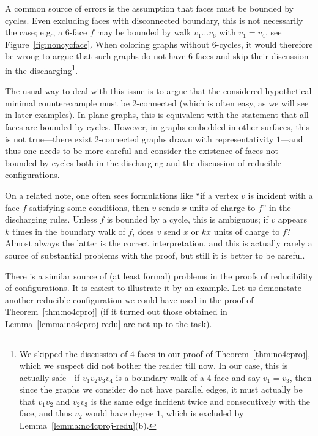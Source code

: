 \documentclass[12pt,twoside,openright,a4paper]{book}
\begin{document}
A common source of errors is the assumption that faces must be bounded by cycles.  Even excluding faces with disconnected boundary,
this is not necessarily the case; e.g., a $6$-face $f$ may be bounded by walk $v_1\ldots v_6$ with $v_1=v_4$, see Figure~\ref{fig:noncycface}.
When coloring graphs without $6$-cycles, it would therefore be wrong to argue that such graphs do not have $6$-faces and skip their
discussion in the discharging\footnote{We skipped the discussion of $4$-faces in our proof of Theorem~\ref{thm:no4cproj}, which
we suspect did not bother the reader till now.  In our case, this is actually safe---if $v_1v_2v_3v_4$ is a boundary walk of a $4$-face
and say $v_1=v_3$, then since the graphs we consider do not have parallel edges, it must actually be that $v_1v_2$ and $v_2v_3$
is the same edge incident twice and consecutively with the face, and thus $v_2$ would have degree $1$, which is excluded by Lemma~\ref{lemma:no4cproj-redu}(b).}.

The usual way to deal with this issue is to argue that the considered hypothetical minimal counterexample must be $2$-connected
(which is often easy, as we will see in later examples).  In plane graphs, this is equivalent with the statement that all faces
are bounded by cycles.  However, in graphs embedded in other surfaces, this is not true---there exist $2$-connected graphs
drawn with representativity $1$---and thus one needs to be more careful and consider the existence of faces not bounded by cycles
both in the discharging and the discussion of reducible configurations.

On a related note, one often sees formulations like ``if a vertex $v$ is incident with a face $f$ satisfying some conditions,
then $v$ sends $x$ units of charge to $f$'' in the discharging rules.  Unless $f$ is bounded by a cycle, this is ambiguous;
if $v$ appears $k$ times in the boundary walk of $f$, does $v$ send $x$ or $kx$ units of charge to $f$?  Almost always the latter
is the correct interpretation, and this is actually rarely a source of substantial problems with the proof, but still it is better to
be careful.

There is a similar source of (at least formal) problems in the proofs of reducibility of configurations.
It is easiest to illustrate it by an example.
Let us demonstate another reducible configuration we could have used in the proof of Theorem~\ref{thm:no4cproj}
(if it turned out those obtained in Lemma~\ref{lemma:no4cproj-redu} are not up to the task).
\end{document}
